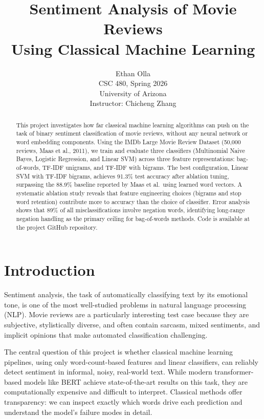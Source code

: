 \documentclass[11pt]{article}
\title{Sentiment Analysis of Movie Reviews\\Using Classical Machine Learning}
\author{
  Ethan Olla \\
  CSC 480, Spring 2026 \\
  University of Arizona \\
  Instructor: Chicheng Zhang
}
\date{}
\begin{document}
\maketitle

\begin{abstract}
This project investigates how far classical machine learning algorithms can push on the task of binary sentiment classification of movie reviews, without any neural network or word embedding components. Using the IMDb Large Movie Review Dataset (50,000 reviews, Maas et al., 2011), we train and evaluate three classifiers (Multinomial Naive Bayes, Logistic Regression, and Linear SVM) across three feature representations: bag-of-words, TF-IDF unigrams, and TF-IDF with bigrams. The best configuration, Linear SVM with TF-IDF bigrams, achieves 91.3\% test accuracy after ablation tuning, surpassing the 88.9\% baseline reported by Maas et al.\ using learned word vectors. A systematic ablation study reveals that feature engineering choices (bigrams and stop word retention) contribute more to accuracy than the choice of classifier. Error analysis shows that 89\% of all misclassifications involve negation words, identifying long-range negation handling as the primary ceiling for bag-of-words methods. Code is available at the project GitHub repository.
\end{abstract}

\section{Introduction}

Sentiment analysis, the task of automatically classifying text by its emotional tone, is one of the most well-studied problems in natural language processing (NLP). Movie reviews are a particularly interesting test case because they are subjective, stylistically diverse, and often contain sarcasm, mixed sentiments, and implicit opinions that make automated classification challenging.

The central question of this project is whether classical machine learning pipelines, using only word-count-based features and linear classifiers, can reliably detect sentiment in informal, noisy, real-world text. While modern transformer-based models like BERT \citep{devlin2019bert} achieve state-of-the-art results on this task, they are computationally expensive and difficult to interpret. Classical methods offer transparency: we can inspect exactly which words drive each prediction and understand the model's failure modes in detail.
\end{document}
